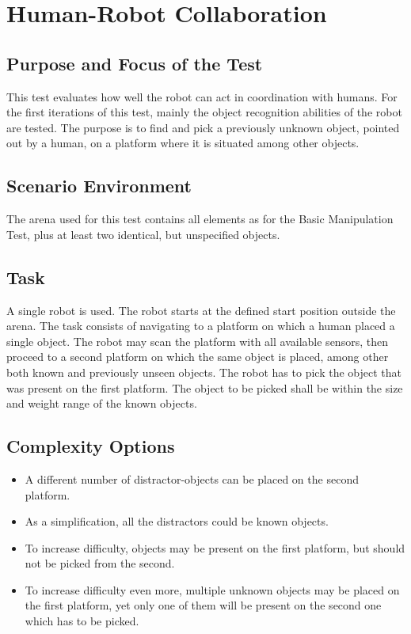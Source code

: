 \newpage
\section{Human-Robot Collaboration}
\subsection{Purpose and Focus of the Test}
This test evaluates how well the robot can act in coordination with humans. For the first iterations of this test, mainly the object recognition abilities of the robot are tested. The purpose is to find and pick a previously unknown object, pointed out by a human, on a platform where it is situated among other objects.


\subsection{Scenario Environment}
The arena used for this test contains all elements as for the Basic Manipulation Test, plus at least two identical, but unspecified objects.

\begin{figure}
\begin{center}
\end{center}
\end{figure}

\subsection{Task}
A single robot is used. The robot starts at the defined start position outside the arena. The task consists of navigating to a platform on which a human placed a single object. The robot may scan the platform with all available sensors, then proceed to a second platform on which the same object is placed, among other both known and previously unseen objects. The robot has to pick the object that was present on the first platform. The object to be picked shall be within the size and weight range of the known {\RCAW} objects.


\subsection{Complexity Options}
\begin{itemize}
\item A different number of distractor-objects can be placed on the second platform.
\item As a simplification, all the distractors could be known {\RCAW} objects.
\item To increase difficulty, {\RCAW} objects may be present on the first platform, but should not be picked from the second.
\item To increase difficulty even more, multiple unknown objects may be placed on the first platform, yet only one of them will be present on the second one which has to be picked.
\end{itemize}

